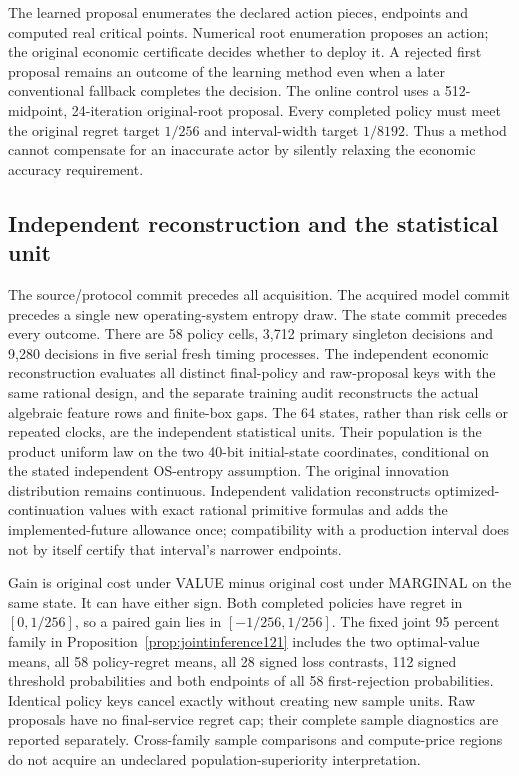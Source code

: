 The learned proposal enumerates the declared action pieces, endpoints and
computed real critical points. Numerical root enumeration proposes an action;
the original economic certificate decides whether to deploy it. A rejected
first proposal remains an outcome of the learning method even when a later
conventional fallback completes the decision. The online control uses a
512-midpoint, 24-iteration original-root proposal. Every completed policy must
meet the original regret target $1/256$ and interval-width target $1/8192$.
Thus a method cannot compensate for an inaccurate actor by silently relaxing
the economic accuracy requirement.

\subsection{Independent reconstruction and the statistical unit}
\label{subsec:validationdesign121}

The source/protocol commit precedes all acquisition. The acquired model
commit precedes a single new operating-system entropy draw. The state commit
precedes every outcome. There are 58 policy cells, 3,712 primary singleton
decisions and 9,280 decisions in five serial fresh timing processes. The
independent economic reconstruction evaluates all distinct final-policy and
raw-proposal keys with the same rational design, and the separate training
audit reconstructs the actual algebraic feature rows and finite-box gaps.
The 64 states, rather than risk cells or repeated clocks, are the independent
statistical units. Their population is the product uniform law on the two
40-bit initial-state coordinates, conditional on the stated independent
OS-entropy assumption. The original innovation distribution remains
continuous. Independent validation reconstructs optimized-continuation values
with exact rational primitive formulas and adds the implemented-future
allowance once; compatibility with a production interval does not by itself
certify that interval's narrower endpoints.

Gain is original cost under VALUE minus original cost under MARGINAL on the
same state. It can have either sign. Both completed policies have regret in
$[0,1/256]$, so a paired gain lies in $[-1/256,1/256]$. The fixed joint
95 percent family in Proposition~\ref{prop:jointinference121} includes the
two optimal-value means, all 58 policy-regret means, all 28 signed loss
contrasts, 112 signed threshold probabilities and both endpoints of all 58
first-rejection probabilities. Identical policy keys cancel exactly without
creating new sample units. Raw proposals have no final-service regret cap;
their complete sample diagnostics are reported separately. Cross-family
sample comparisons and compute-price regions do not acquire an undeclared
population-superiority interpretation.

